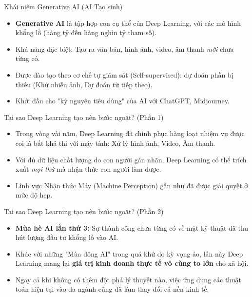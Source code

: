 \documentclass[aspectratio=169]{beamer}
\begin{document}
\begin{frame}{Khái niệm Generative AI (AI Tạo sinh)}
    \begin{itemize}
        \item \textbf{Generative AI} là tập hợp con cụ thể của Deep Learning, với các mô hình khổng lồ (hàng tỷ đến hàng nghìn tỷ tham số).
        \item Khả năng đặc biệt: Tạo ra văn bản, hình ảnh, video, âm thanh \textit{mới} chưa từng có.
        \item Được đào tạo theo cơ chế tự giám sát (Self-supervised): dự đoán phần bị thiếu (Khử nhiễu ảnh, Dự đoán từ tiếp theo).
        \item Khởi đầu cho "kỷ nguyên tiêu dùng" của AI với ChatGPT, Midjourney.
    \end{itemize}
\end{frame}

\begin{frame}{Tại sao Deep Learning tạo nên bước ngoặt? (Phần 1)}
    \begin{itemize}
        \item Trong vòng vài năm, Deep Learning đã chinh phục hàng loạt nhiệm vụ được coi là bất khả thi với máy tính: Xử lý hình ảnh, Video, Âm thanh.
        \item Với đủ dữ liệu chất lượng do con người gán nhãn, Deep Learning có thể trích xuất \textit{mọi thứ} mà nhận thức con người làm được.
        \item Lĩnh vực Nhận thức Máy (Machine Perception) gần như đã được giải quyết ở mức độ hẹp.
    \end{itemize}
\end{frame}

\begin{frame}{Tại sao Deep Learning tạo nên bước ngoặt? (Phần 2)}
    \begin{itemize}
        \item \textbf{Mùa hè AI lần thứ 3:} Sự thành công chưa từng có về mặt kỹ thuật đã thu hút lượng đầu tư khổng lồ vào AI.
        \item Khác với những "Mùa đông AI" trong quá khứ do kỳ vọng ảo, lần này Deep Learning mang lại \textbf{giá trị kinh doanh thực tế vô cùng to lớn} cho xã hội.
        \item Ngay cả khi không có thêm đột phá lý thuyết nào, việc ứng dụng các thuật toán hiện tại vào đa ngành cũng đã làm thay đổi cả nền kinh tế.
    \end{itemize}
\end{frame}
\end{document}
